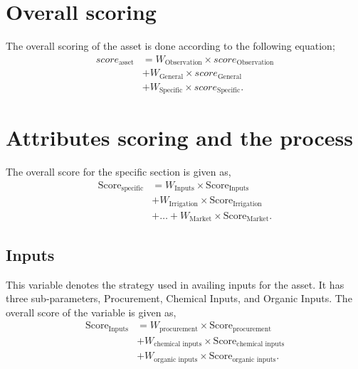 \documentclass[oneside,twocolumn]{article}
\begin{document}
\section{Overall scoring}
The overall scoring of the asset is done according to the following equation;
\begin{align*}
  score_{\text{asset}} &= W_{\text{Observation}} \times score_{\text{Observation}} \\
  &+ W_{\text{General}} \times score_{\text{General}} \\
  &+ W_{\text{Specific}} \times score_{\text{Specific}}.
\end{align*}
\section{Attributes scoring and the process}
The overall score for the specific section is given as,
\begin{align*}
  \text{Score}_{\text{specific}} &= W_{\text{Inputs}} \times \text{Score}_{\text{Inputs}}
  \\
  &+ W_{\text{Irrigation}} \times \text{Score}_{\text{Irrigation}} \\
  &+ \dots + W_{\text{Market}} \times \text{Score}_{\text{Market}}.
\end{align*}

\subsection{Inputs}
This variable denotes the strategy used in availing inputs for the asset. It has three sub-parameters, Procurement, Chemical Inputs, and Organic Inputs. The overall
score of the variable is given as,
\begin{align*}
  \text{Score}_{\text{Inputs}} &= W_{\text{procurement}} \times \text{Score}_{\text{procurement}} \\
  &+ W_{\text{chemical inputs}} \times \text{Score}_{\text{chemical inputs}} \\
  &+ W_{\text{organic inputs}} \times \text{Score}_{\text{organic inputs}}.
\end{align*}
\end{document}
